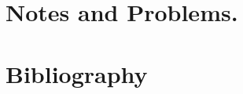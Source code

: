 \documentclass[12pt,leqno]{book}
\begin{document}
\part{Notes and Problems.}













%
\part{Bibliography}




\end{document}
